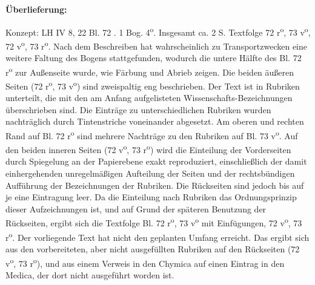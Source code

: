    
        
        \begin{ledgroupsized}[r]{120mm}
        \footnotesize 
        \pstart        
        \noindent\textbf{\"{U}berlieferung:}  
        \pend
        \end{ledgroupsized}
      
       
              \begin{ledgroupsized}[r]{114mm}
              \footnotesize 
              \pstart \parindent -6mm
              Konzept: LH IV 8, 22 Bl. 72 . 1 Bog. 4\textsuperscript{o}. Insgesamt ca. 2 S. Textfolge 72 r\textsuperscript{o}, 73 v\textsuperscript{o}, 72 v\textsuperscript{o}, 73 r\textsuperscript{o}. Nach dem Beschreiben hat wahrscheinlich zu Transportzwecken eine weitere Faltung des Bogens stattgefunden, wodurch die untere H\"{a}lfte des Bl. 72 r\textsuperscript{o} zur Außenseite wurde, wie F\"{a}rbung und Abrieb zeigen. Die beiden \"{a}ußeren Seiten (72 r\textsuperscript{o}, 73 v\textsuperscript{o}) sind zweispaltig eng beschrieben. Der Text ist in Rubriken unterteilt, die mit den am Anfang aufgelisteten Wissenschafts-Bezeichnungen \"{u}berschrieben sind. Die Eintr\"{a}ge zu unterschiedlichen Rubriken wurden nachtr\"{a}glich durch Tintenstriche voneinander abgesetzt. Am oberen und rechten Rand auf Bl. 72 r\textsuperscript{o} sind mehrere Nachtr\"{a}ge zu den Rubriken auf Bl. 73 v\textsuperscript{o}. Auf den beiden inneren Seiten (72 v\textsuperscript{o}, 73 r\textsuperscript{o}) wird die Einteilung der Vorderseiten durch Spiegelung an der Papierebene exakt reproduziert, einschließlich der damit einhergehenden unregelm\"{a}ßigen Aufteilung der Seiten und der rechtsb\"{u}ndigen Auff\"{u}hrung der Bezeichnungen der Rubriken. Die R\"{u}ckseiten sind jedoch bis auf je eine Eintragung leer. Da die Einteilung nach Rubriken das Ordnungsprinzip dieser Aufzeichnungen ist, und auf Grund der sp\"{a}teren Benutzung der R\"{u}ckseiten, ergibt sich die Textfolge Bl. 72 r\textsuperscript{o}, 73 v\textsuperscript{o} mit Einf\"{u}gungen, 72 v\textsuperscript{o}, 73 r\textsuperscript{o}. Der vorliegende Text hat nicht den geplanten Umfang erreicht. Das ergibt sich aus den vorbereiteten, aber nicht ausgef\"{u}llten Rubriken auf den R\"{u}ckseiten (72 v\textsuperscript{o}, 73 r\textsuperscript{o}), und aus einem Verweis in den Chymica auf einen Eintrag in den Medica, der dort nicht ausgef\"{u}hrt worden ist.\pend
              \end{ledgroupsized}
       

